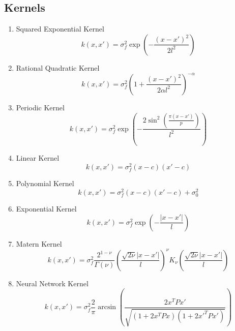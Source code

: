 \subsection{Kernels}
\begin{enumerate}
    \item Squared Exponential Kernel
    \begin{equation}
        k(x, x') = \sigma_f^2 \exp \left( - \frac{(x - x')^2}{2 l^2} \right)
    \end{equation}
    \item Rational Quadratic Kernel
    \begin{equation}
        k(x, x') = \sigma_f^2 \left( 1 + \frac{(x - x')^2}{2 \alpha l^2} \right)^{-\alpha}
    \end{equation}
    \item Periodic Kernel
    \begin{equation}
        k(x, x') = \sigma_f^2 \exp \left( - \frac{2 \sin^2 \left( \frac{\pi (x - x')}{p} \right)}{l^2} \right)
    \end{equation}
    \item Linear Kernel
    \begin{equation}
        k(x, x') = \sigma_f^2 (x - c) (x' - c)
    \end{equation}
    \item Polynomial Kernel
    \begin{equation}
        k(x, x') = \sigma_f^2 (x - c) (x' - c) + \sigma_0^2
    \end{equation}
    \item Exponential Kernel
    \begin{equation}
        k(x, x') = \sigma_f^2 \exp \left( - \frac{|x - x'|}{l} \right)
    \end{equation}
    \item Matern Kernel
    \begin{equation}
        k(x, x') = \sigma_f^2 \frac{2^{1 - \nu}}{\Gamma(\nu)} \left( \frac{\sqrt{2 \nu} |x - x'|}{l} \right)^{\nu} K_{\nu} \left( \frac{\sqrt{2 \nu} |x - x'|}{l} \right)
    \end{equation}
    \item Neural Network Kernel
    \begin{equation}
        k(x, x') = \sigma_f^2 \frac{2}{\pi} \arcsin \left( \frac{2 x^T P x'}{\sqrt{(1 + 2 x^T P x) (1 + 2 x'^T P x')}} \right)
    \end{equation}
\end{enumerate}
